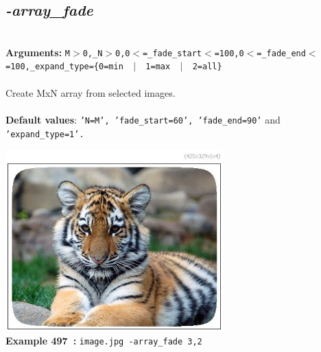 \documentclass[a4paper,11pt,twoside]{book}
\begin{document}
\subsection{\emph{-array\_fade} }\vspace*{-0.5em}
~\\\textbf{Arguments: } 
{\small \texttt{M$>$0,\_N$>$0,0$<$=\_fade\_start$<$=100,0$<$=\_fade\_end$<$=100,\_expand\_type=\{0=min ~$|$~ 1=max ~$|$~ 2=all\}}}\\~\\
Create MxN array from selected images.
~\\~\\\textbf{Default values}: {\small \texttt{'N=M', 'fade\_start=60', 'fade\_end=90'} and \texttt{'expand\_type=1'.}}
\begin{center}\includegraphics[keepaspectratio=true,height=7cm,width=\textwidth]{img/gmic_def497.jpg}\\
{\footnotesize \textbf{Example 497~:} \texttt{image.jpg -array\_fade 3,2}}
\end{center}
\end{document}
